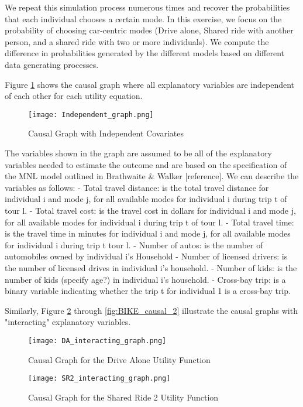 We repeat this simulation process numerous times and recover the probabilities that each individual chooses a certain mode. 
In this exercise, we focus on the probability of choosing car-centric modes (Drive alone, Shared ride with another 
person, and a shared ride with two or more individuals).
We compute the difference in probabilities generated by the different models based on different data generating processes.

Figure \ref{fig:IND_GRAPH} shows the causal graph where all explanatory variables are independent of each other for each utility equation.

\begin{figure}
   \centering
   \texttt{[image: Independent\_graph.png]}
   \caption{Causal Graph with Independent Covariates}
   \label{fig:IND_GRAPH}
\end{figure}

The variables shown in the graph are assumed to be all of the explanatory variables needed to estimate the outcome and are based 
on the specification of the MNL model outlined in Brathwaite & Walker [reference].
We can describe the variables as follows:
- Total travel distance: is the total travel distance for individual i and mode j, for all available modes for individual i during trip t of tour l.
- Total travel cost: is the travel cost in dollars for individual i and mode j, for all available modes for individual i during trip t of tour l.
- Total travel time: is the travel time in minutes for individual i and mode j, for all available modes for individual i during trip t tour l.
- Number of autos: is the number of automobiles owned by individual i's Household
- Number of licensed drivers: is the number of licensed drives in individual i's household.
- Number of kids: is the number of kids (specify age?) in individual i's household.
- Cross-bay trip: is a binary variable indicating whether the trip t for individual 1 is a cross-bay trip.

Similarly, Figure \ref{fig:DA_causal_2} through \ref{fig:BIKE_causal_2} illustrate the causal graphs with "interacting" explanatory variables.
\begin{figure}
   \centering
   \texttt{[image: DA\_interacting\_graph.png]}
   \caption{Causal Graph for the Drive Alone Utility Function}
   \label{fig:DA_causal_2}
\end{figure}

\begin{figure}
   \centering
   \texttt{[image: SR2\_interacting\_graph.png]}
   \caption{Causal Graph for the Shared Ride 2 Utility Function}
   \label{fig:SR2_causal_2}
\end{figure}

